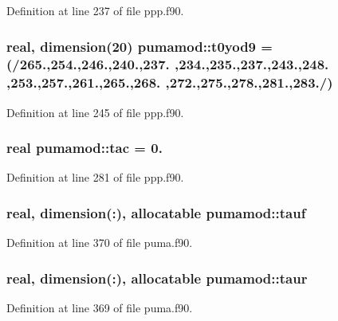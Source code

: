 \-Definition at line 237 of file ppp.\-f90.

\hypertarget{classpumamod_ac0e77a6a01e1b88a9c1b29535bf4a5d5}{
\subsubsection[{t0yod9}]{\setlength{\rightskip}{0pt plus 5cm}real, dimension(20) {\bf pumamod\-::t0yod9} = (/265.,254.,246.,240.,237. ,234.,235.,237.,243.,248. ,253.,257.,261.,265.,268. ,272.,275.,278.,281.,283./)}}
\label{classpumamod_ac0e77a6a01e1b88a9c1b29535bf4a5d5}


\-Definition at line 245 of file ppp.\-f90.

\hypertarget{classpumamod_aa0e01ba5d349492b3449f389b5f93fed}{
\subsubsection[{tac}]{\setlength{\rightskip}{0pt plus 5cm}real {\bf pumamod\-::tac} = 0.}}
\label{classpumamod_aa0e01ba5d349492b3449f389b5f93fed}


\-Definition at line 281 of file ppp.\-f90.

\hypertarget{classpumamod_aaddf02e0bb890f2c703effae4cf26a68}{
\subsubsection[{tauf}]{\setlength{\rightskip}{0pt plus 5cm}real, dimension(\-:), allocatable {\bf pumamod\-::tauf}}}
\label{classpumamod_aaddf02e0bb890f2c703effae4cf26a68}


\-Definition at line 370 of file puma.\-f90.

\hypertarget{classpumamod_aa37496e277d03000616cdb2e5b22d7c0}{
\subsubsection[{taur}]{\setlength{\rightskip}{0pt plus 5cm}real, dimension(\-:), allocatable {\bf pumamod\-::taur}}}
\label{classpumamod_aa37496e277d03000616cdb2e5b22d7c0}


\-Definition at line 369 of file puma.\-f90.

